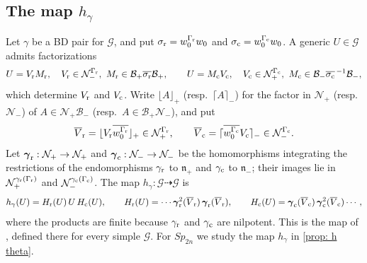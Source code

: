 \documentclass[a4paper]{amsart}
\numberwithin{equation}{section}
\theoremstyle{definition}
\theoremstyle{remark}
\newcommand{\mfn}{\mathfrak{n}}
\newcommand{\mcG}{\mathcal{G}}
\newcommand{\mcN}{\mathcal{N}}
\newcommand{\mcB}{\mathcal{B}}
\newcommand{\rr}{{\rm r}}
\newcommand{\cc}{{\rm c}}
\newcommand{\Sp}{Sp_{2n}}
\begin{document}
\subsection{The map \texorpdfstring{$h_\gamma$}{h}}
\label{sec: h}
Let $\gamma$ be a BD pair for $\mcG$, and put $\sigma_{\rr}=w_0^{\Gamma_{\rr}}w_0$ and $\sigma_{\cc}=w_0^{\Gamma_{\cc}}w_0$.
A generic $U\in\mcG$ admits factorizations
\begin{equation*}
  U=V_{\rr}M_{\rr},\quad V_{\rr}\in\mcN_-^{\Gamma_{\rr}},\ M_{\rr}\in\mcB_+\overline{\sigma_{\rr}}\mcB_+,
  \qquad
  U=M_{\cc}V_{\cc},\quad V_{\cc}\in\mcN_+^{\Gamma_{\cc}},\ M_{\cc}\in\mcB_-\overline{\sigma_{\cc}}^{\,-1}\mcB_-,
\end{equation*}
which determine $V_{\rr}$ and $V_{\cc}$.
Write $\lfloor A\rfloor_+$ (resp.\ $\lceil A\rceil_-$) for the factor in $\mcN_+$ (resp.\ $\mcN_-$) of $A\in\mcN_+\mcB_-$ (resp.\ $A\in\mcB_+\mcN_-$), and put
\begin{equation*}
  \overline{V}_{\rr}=\lfloor V_{\rr}\overline{w_0^{\Gamma_{\rr}}}\rfloor_+\in\mcN_+^{\Gamma_{\rr}},
  \qquad
  \overline{V}_{\cc}=\lceil \overline{w_0^{\Gamma_{\cc}}}V_{\cc}\rceil_-\in\mcN_-^{\Gamma_{\cc}}.
\end{equation*}
Let $\boldsymbol\gamma_{\rr}:\mcN_+\to\mcN_+$ and $\boldsymbol\gamma_{\cc}:\mcN_-\to\mcN_-$ be the homomorphisms integrating the restrictions of the endomorphisms $\gamma_{\rr}$ to $\mfn_+$ and $\gamma_{\cc}$ to $\mfn_-$; their images lie in $\mcN_+^{\gamma_{\rr}(\Gamma_{\rr})}$ and $\mcN_-^{\gamma_{\cc}(\Gamma_{\cc})}$.
The map $h_\gamma:\mcG\dashrightarrow\mcG$ is
\begin{equation}
  \label{eq: h}
  h_\gamma(U)=H_{\rr}(U)\,U\,H_{\cc}(U),
  \qquad
  H_{\rr}(U)=\cdots\boldsymbol\gamma_{\rr}^2(\overline{V}_{\rr})\,\boldsymbol\gamma_{\rr}(\overline{V}_{\rr}),
  \qquad
  H_{\cc}(U)=\boldsymbol\gamma_{\cc}(\overline{V}_{\cc})\,\boldsymbol\gamma_{\cc}^2(\overline{V}_{\cc})\cdots,
\end{equation}
where the products are finite because $\gamma_{\rr}$ and $\gamma_{\cc}$ are nilpotent.
This is the map of \cite[Section~3.1]{GSV23}, defined there for every simple $\mcG$.
For $\Sp$ we study the map $h_\gamma$ in \cref{prop: h theta}.
\end{document}
